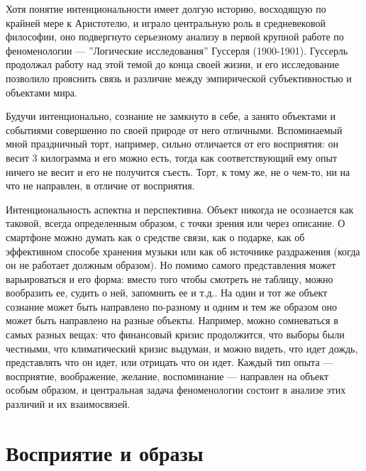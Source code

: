 \documentclass[11pt]{book}
\begin{document}
Хотя понятие интенциональности имеет долгую историю, восходящую по крайней мере к Аристотелю, и играло центральную роль в средневековой философии, оно подвергнуто серьезному анализу в первой крупной работе по феноменологии --- ''Логические исследования'' Гуссерля (1900-1901). Гуссерль продолжал работу над этой темой до конца своей жизни, и его исследование позволило прояснить связь и различие между эмпирической субъективностью и объектами мира.

Будучи интенционально, сознание не замкнуто в себе, а занято объектами и событиями совершенно по своей природе от него отличными. Вспоминаемый мной праздничный торт, например, сильно отличается от его восприятия: он весит 3 килограмма и его можно есть, тогда как соответствующий ему опыт ничего не весит и его не получится съесть. Торт, к тому же, не о чем-то, ни на что не направлен, в отличие от восприятия.

Интенциональность аспектна и перспективна. Объект никогда не осознается как таковой, всегда определенным образом, с точки зрения или через описание. О смартфоне можно думать как о средстве связи, как о подарке, как об эффективном способе хранения музыки или как об источнике раздражения (когда он не работает должным образом). Но помимо самого представления может варьироваться и его форма: вместо того чтобы смотреть не таблицу, можно вообразить ее, судить о ней, запомнить ее и т.д.. На один и тот же объект сознание может быть направлено по-разному и одним и тем же образом оно может быть направлено на разные объекты. Например, можно сомневаться в самых разных вещах: что финансовый кризис продолжится, что выборы были честными, что климатический кризис выдуман, и можно видеть, что идет дождь, представлять что он идет, или отрицать что он идет. Каждый тип опыта --- восприятие, воображение, желание, воспоминание --- направлен на объект особым образом, и центральная задача феноменологии состоит в анализе этих различий и их взаимосвязей.

\section{Восприятие и образы}
\end{document}
